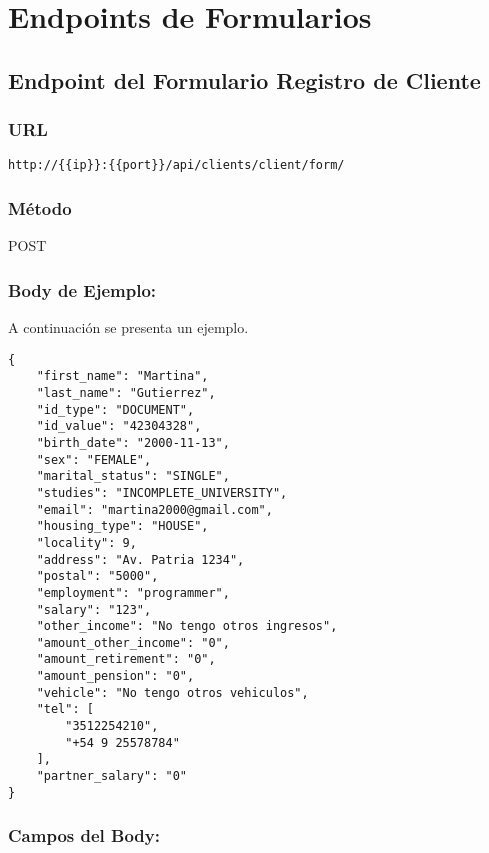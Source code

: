 \chapter{Endpoints de Formularios}\label{cap:anexo-expoint-forms}

\section{Endpoint del Formulario Registro de Cliente}

\subsection*{URL}
\texttt{http://\{\{ip\}\}:\{\{port\}\}/api/clients/client/form/}

\subsection*{Método}
POST

\subsection*{Body de Ejemplo:}
A continuación se presenta un ejemplo.
\begin{lstlisting}[caption=Body de Ejemplo, label=example-body]
{
    "first_name": "Martina",
    "last_name": "Gutierrez",
    "id_type": "DOCUMENT",
    "id_value": "42304328",
    "birth_date": "2000-11-13",
    "sex": "FEMALE",
    "marital_status": "SINGLE",
    "studies": "INCOMPLETE_UNIVERSITY",
    "email": "martina2000@gmail.com",
    "housing_type": "HOUSE",
    "locality": 9,
    "address": "Av. Patria 1234",
    "postal": "5000",
    "employment": "programmer",
    "salary": "123",
    "other_income": "No tengo otros ingresos",
    "amount_other_income": "0",
    "amount_retirement": "0",
    "amount_pension": "0",
    "vehicle": "No tengo otros vehiculos",
    "tel": [
        "3512254210",
        "+54 9 25578784"
    ],
    "partner_salary": "0"
}
\end{lstlisting}
\subsection*{Campos del Body:}

